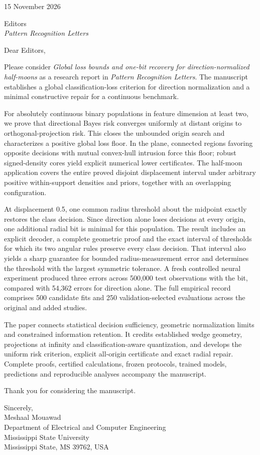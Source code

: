 \documentclass[11pt,letterpaper]{article}
\begin{document}
15 November 2026

Editors\\
\emph{Pattern Recognition Letters}

Dear Editors,

Please consider \emph{Global loss bounds and one-bit recovery for direction-normalized half-moons} as a research report in \emph{Pattern Recognition Letters}. The manuscript establishes a global classification-loss criterion for direction normalization and a minimal constructive repair for a continuous benchmark.

For absolutely continuous binary populations in feature dimension at least two, we prove that directional Bayes risk converges uniformly at distant origins to orthogonal-projection risk. This closes the unbounded origin search and characterizes a positive global loss floor. In the plane, connected regions favoring opposite decisions with mutual convex-hull intrusion force this floor; robust signed-density cores yield explicit numerical lower certificates. The half-moon application covers the entire proved disjoint displacement interval under arbitrary positive within-support densities and priors, together with an overlapping configuration.

At displacement 0.5, one common radius threshold about the midpoint exactly restores the class decision. Since direction alone loses decisions at every origin, one additional radial bit is minimal for this population. The result includes an explicit decoder, a complete geometric proof and the exact interval of thresholds for which its two angular rules preserve every class decision. That interval also yields a sharp guarantee for bounded radius-measurement error and determines the threshold with the largest symmetric tolerance. A fresh controlled neural experiment produced three errors across 500,000 test observations with the bit, compared with 54,362 errors for direction alone. The full empirical record comprises 500 candidate fits and 250 validation-selected evaluations across the original and added studies.

The paper connects statistical decision sufficiency, geometric normalization limits and constrained information retention. It credits established wedge geometry, projections at infinity and classification-aware quantization, and develops the uniform risk criterion, explicit all-origin certificate and exact radial repair. Complete proofs, certified calculations, frozen protocols, trained models, predictions and reproducible analyses accompany the manuscript.

Thank you for considering the manuscript.

Sincerely,\\[0.6em]
Meshaal Mouawad\\
Department of Electrical and Computer Engineering\\
Mississippi State University\\
Mississippi State, MS 39762, USA
\end{document}
